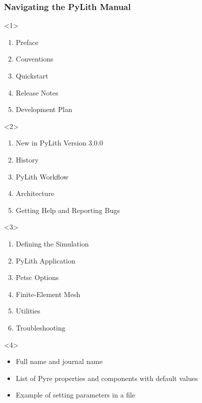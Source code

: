 \documentclass[aspectratio=169]{beamer}
\begin{document}
\begin{frame}[t]
  \frametitle{Navigating the PyLith Manual}
  \summary{}

  \begin{itemize}
    \begin{onlyenv}<1>
      \begin{enumerate}
      \item Preface
      \item Conventions
      \item Quickstart
      \item Release Notes
      \item Development Plan
      \end{enumerate}
    \end{onlyenv}
    \begin{onlyenv}<2>
      \begin{enumerate}
      \item New in PyLith Version 3.0.0
      \item History
      \item PyLith Workflow
      \item Architecture
      \item Getting Help and Reporting Bugs
      \end{enumerate}
    \end{onlyenv}
    \begin{onlyenv}<3>
      \begin{enumerate}
      \item Defining the Simulation
      \item PyLith Application
      \item Petsc Options
      \item Finite-Element Mesh
      \item Utilities
      \item Troubleshooting
      \end{enumerate}
    \end{onlyenv}
    \begin{onlyenv}<4>
      \begin{itemize}
      \item Full name and journal name
      \item List of Pyre properties and components with default values
      \item Example of setting parameters in a  file

\end{itemize}
\end{onlyenv}
\end{itemize}
\end{frame}
\end{document}
